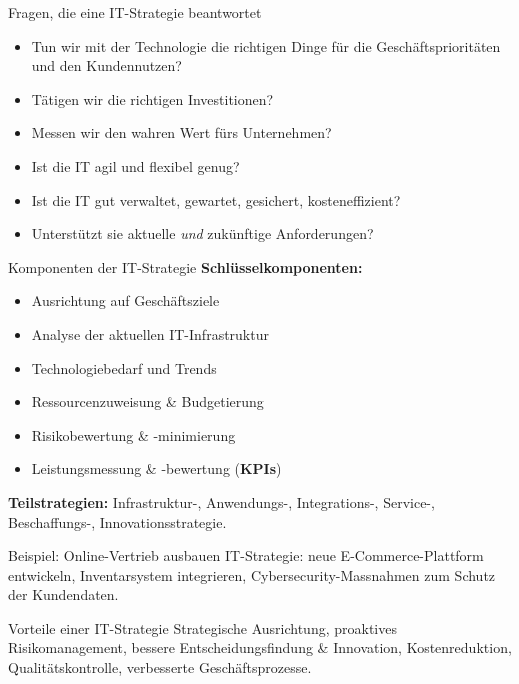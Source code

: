 \documentclass[a4paper, fontsize=7pt]{scrartcl}
\begin{document}
\begin{subbox}{Fragen, die eine IT-Strategie beantwortet}
\begin{itemize}
    \item Tun wir mit der Technologie die richtigen Dinge für die
          Geschäftsprioritäten und den Kundennutzen?
    \item Tätigen wir die richtigen Investitionen?
    \item Messen wir den wahren Wert fürs Unternehmen?
    \item Ist die IT agil und flexibel genug?
    \item Ist die IT gut verwaltet, gewartet, gesichert, kosteneffizient?
    \item Unterstützt sie aktuelle \emph{und} zukünftige Anforderungen?
\end{itemize}
\end{subbox}

\begin{mainbox}{Komponenten der IT-Strategie}
\textbf{Schlüsselkomponenten:}
\begin{itemize}
    \item Ausrichtung auf Geschäftsziele
    \item Analyse der aktuellen IT-Infrastruktur
    \item Technologiebedarf und Trends
    \item Ressourcenzuweisung \& Budgetierung
    \item Risikobewertung \& -minimierung
    \item Leistungsmessung \& -bewertung (\textbf{KPIs})
\end{itemize}
\textbf{Teilstrategien:} Infrastruktur-, Anwendungs-, Integrations-, Service-,
Beschaffungs-, Innovationsstrategie.
\end{mainbox}

\begin{subbox}{Beispiel: Online-Vertrieb ausbauen}
IT-Strategie: neue E-Commerce-Plattform entwickeln, Inventarsystem integrieren,
Cybersecurity-Massnahmen zum Schutz der Kundendaten.
\end{subbox}

\begin{subbox}{Vorteile einer IT-Strategie}
Strategische Ausrichtung, proaktives Risikomanagement, bessere
Entscheidungsfindung \& Innovation, Kostenreduktion, Qualitätskontrolle,
verbesserte Geschäftsprozesse.
\end{subbox}
\end{document}
